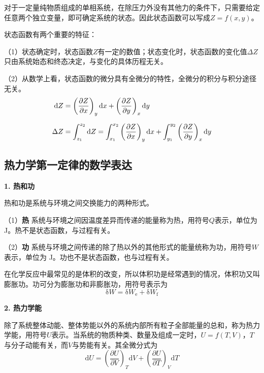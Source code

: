 \documentclass[lang=cn,newtx,11pt,scheme=chinese]{elegantbook}
\begin{document}
对于一定量纯物质组成的单相系统，在除压力外没有其他力的条件下，只需要给定任意两个独立变量，即可确定系统的状态。因此状态函数可以写成$Z=f(x,y)$。

状态函数有两个重要的特征：

（1）状态确定时，状态函数$Z$有一定的数值；状态变化时，状态函数的变化值$\Delta Z$只由系统始态和终态决定，与变化的具体历程无关。

（2）从数学上看，状态函数的微分具有全微分的特性，全微分的积分与积分途径无关。
\begin{equation}
	\begin{aligned}
		\mathrm{d}Z &= \left ( \frac{\partial Z}{\partial x}  \right )_y\mathrm{d}x+ \left ( \frac{\partial Z}{\partial y}  \right )_x\mathrm{d}y \\[1.5ex]
		\Delta Z &= \int_{z_1}^{z_2} \mathrm{d}Z=\int_{x_1}^{x_2}  \left ( \frac{\partial Z}{\partial x}  \right )_y\mathrm{d}x+\int_{y_1}^{y_2}  \left ( \frac{\partial Z}{\partial y}  \right )_x\mathrm{d}y
	\end{aligned} \notag
\end{equation}

\subsection{热力学第一定律的数学表达}

\textbf{1. 热和功}

热和功是系统与环境之间交换能力的两种形式。

（1）\textbf{热} \quad 系统与环境之间因温度差异而传递的能量称为热，用符号$Q$表示，单位为 J。热不是状态函数，与过程有关。

（2）\textbf{功} \quad 系统与环境之间传递的除了热以外的其他形式的能量统称为功，用符号$W$表示，单位为 J。功也不是状态函数，也与过程有关。

在化学反应中最常见的是体积的改变，所以体积功是经常遇到的情况，体积功又叫膨胀功。功可分为膨胀功和非膨胀功，用符号表示为
$$
\mathrm{\delta} W=\mathrm{\delta} W_\mathrm{e} + \mathrm{\delta} W_\mathrm{f}
$$

\textbf{2. 热力学能}

除了系统整体动能、整体势能以外的系统内部所有粒子全部能量的总和，称为热力学能，用符号$U$表示。当系统的物质种类、数量及组成一定时，$U=f(T,V)$，$T$与分子动能有关，而$V$与势能有关。其全微分式为
\begin{equation}
	\mathrm{d}U=\left ( \frac{\partial U}{\partial V}  \right )_T\mathrm{d}V+ \left ( \frac{\partial U}{\partial T}  \right )_V\mathrm{d}T
\end{equation}
\end{document}
